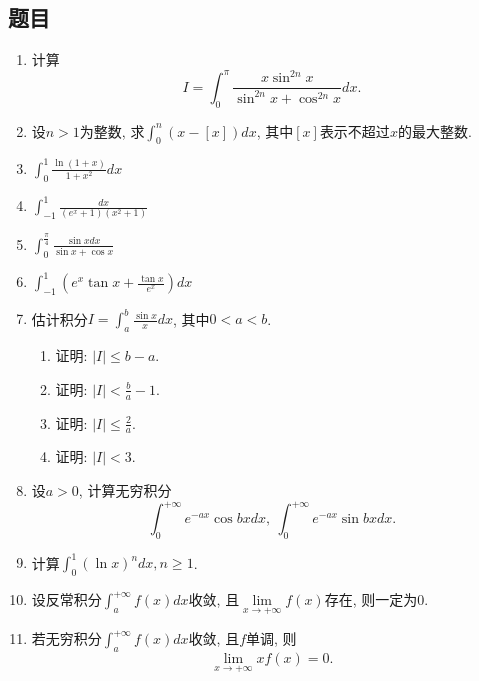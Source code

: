 \documentclass[UTF8,11pt, a4paper, oneside, fontset=none]{ctexbook}
\begin{document}
\subsection*{题目}
\begin{enumerate}

\item 计算
\[
I = \int_0^{\pi} \frac{x \sin^{2n} x}{\sin^{2n} x + \cos^{2n} x}dx.
\]

\item 设$n >1$为整数, 求$\int_0^n (x - [x])dx$, 其中$[x]$表示不超过$x$的最大整数. 

\item $\int_0^1 \frac{\ln (1+x)}{1+x^2}dx$

\item $\int_{-1}^1 \frac{dx}{(e^x+1)(x^2 + 1)}$

\item $\int_0^{\frac{\pi}{4}} \frac{\sin x dx}{\sin x + \cos x} $

\item $\int_{-1}^1 (e^x \tan x + \frac{\tan x}{e^x}) dx$

\item 估计积分$I = \int_a^b \frac{\sin x}{x}dx$, 其中$0 < a < b$.

\begin{enumerate}
\item 证明: $| I | \leq b -a$.

\item 证明: $| I | < \frac{b}{a} -1$.

\item 证明: $| I | \leq \frac{2}{a}$.

\item 证明: $|I| < 3$.

\end{enumerate}

\item 设$a > 0$, 计算无穷积分
\[
\int_0^{+\infty} e^{-ax} \cos bx dx, \ \int_0^{+\infty} e^{-ax} \sin bx dx.
\]

\item 计算$\int_0^1 (\ln x)^n dx, n \geq 1$.

\item 设反常积分$\int_a^{+\infty} f(x) dx$收敛, 且$\lim\limits_{x \to +\infty} f(x)$存在, 则一定为0.

\item 若无穷积分$\int_a^{+\infty} f(x) dx$收敛, 且$f$单调, 则
\[
\lim_{x \to +\infty} xf(x) =0.
\]
\end{enumerate}
\clearpage
\end{document}
